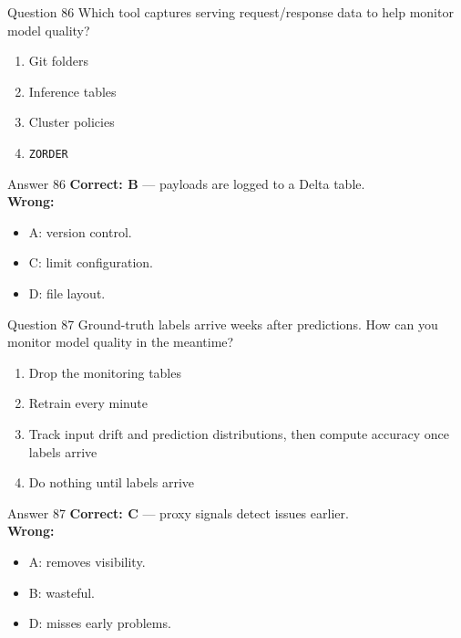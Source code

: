 \documentclass[aspectratio=169,11pt]{beamer}
\begin{document}
\begin{frame}{Question 86}
Which tool captures serving request/response data to help monitor model quality?
\begin{enumerate}[label=\Alph*.]
\item Git folders
\item Inference tables
\item Cluster policies
\item \texttt{ZORDER}
\end{enumerate}
\end{frame}
\begin{frame}{Answer 86}
\textbf{Correct: B} --- payloads are logged to a Delta table.\\
\vspace{0.5em}
\textbf{Wrong:}
\begin{itemize}
\item A: version control.
\item C: limit configuration.
\item D: file layout.
\end{itemize}
\end{frame}

\begin{frame}{Question 87}
Ground-truth labels arrive weeks after predictions. How can you monitor model quality in the meantime?
\begin{enumerate}[label=\Alph*.]
\item Drop the monitoring tables
\item Retrain every minute
\item Track input drift and prediction distributions, then compute accuracy once labels arrive
\item Do nothing until labels arrive
\end{enumerate}
\end{frame}
\begin{frame}{Answer 87}
\textbf{Correct: C} --- proxy signals detect issues earlier.\\
\vspace{0.5em}
\textbf{Wrong:}
\begin{itemize}
\item A: removes visibility.
\item B: wasteful.
\item D: misses early problems.
\end{itemize}
\end{frame}
\end{document}
